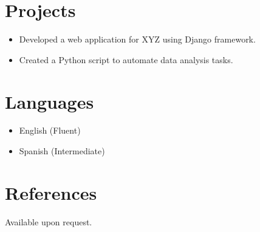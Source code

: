 \documentclass{article}
\begin{document}
\section*{Projects}
\begin{itemize}[label=$\bullet$, leftmargin=*]
    \item Developed a web application for XYZ using Django framework.
    \item Created a Python script to automate data analysis tasks.
\end{itemize}

\section*{Languages}
\begin{itemize}[label=$\bullet$, leftmargin=*]
    \item English (Fluent)
    \item Spanish (Intermediate)
\end{itemize}

\section*{References}
Available upon request.
\end{document}
